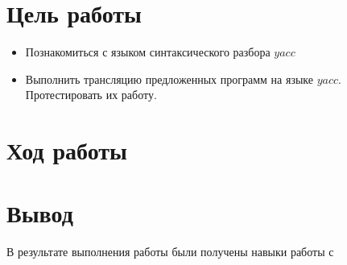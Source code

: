 





\section{Цель работы}
\begin{itemize}
\item Познакомиться с языком синтаксического разбора $yacc$
\item Выполнить трансляцию предложенных программ на языке $yacc$. Протестировать их работу.
\end{itemize}


\section{Ход работы}



\section{Вывод}

    В результате выполнения работы были получены навыки работы с


